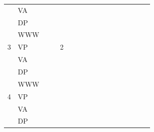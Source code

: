 \documentclass[FP,DP]{tulthesis}
\begin{document}
{{{{{{{\begin{table}[]
\begin{tabular}{@{}|C{0.5cm}|C{1cm}|C{0.7cm}|C{0.6cm}|C{0.6cm}|C{0.7cm}|C{0.7cm}|C{0.6cm}|C{0.6cm}|C{0.6cm}|C{0.7cm}|C{0.7cm}|C{0.7cm}|C{0.7cm}|C{0.7cm}|C{0.7cm}|C{0.7cm}|@{}}
  & VA  &         &        &       &        &          &               &           &            &            &          &         &         &        &         &          \\ 
  & DP  &         &        &       &        &        &           &           &            &            &          &        &         &        &         &          \\  
  & WWW &         &        &       &        &         &           &           &            &            &          &        &         &        &         &      \\   
3 & VP  &         &        &2       &        &         &           &           &            &            &          &        &          &        &         &          \\  
  & VA  &         &        &&        &          &           &           &            &            &          &          &        &       &         &          \\  
  & DP  &         &        &       &        &         &           &           &            &            &          &        &         &        &         &          \\  
  & WWW &         &        &       &        &         &           &           &            &            &          &        &         &        &         &      \\    
4 & VP  &         &        &       &        &         &           &           &           &            &          &        &           &        &         &          \\  
  & VA  &         &        &       &        &         &           &           &               &               &          &        &         &        &         &          \\  
  & DP  &         &        &       &        &         &           &           &            &            &          &        &         &        &         &          \\  

\end{tabular}
\end{table}}}}}}}}
\end{document}
